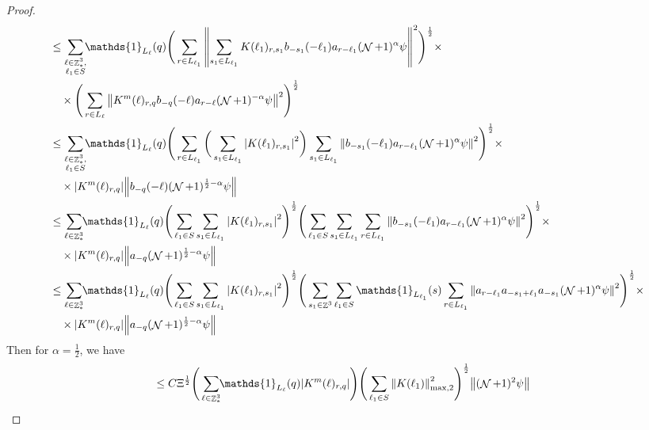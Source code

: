 \documentclass[12pt,a4paper]{article}
\numberwithin{equation}{section}
\newcommand{\1}{\mathbb{I}}
\DeclareMathOperator{\Z}{\mathbb{Z}}
\DeclareMathOperator{\NN}{\mathcal{N}}
\newcommand{\half}{\frac{1}{2}}
\newcommand{\normmaxii}[1]{\norm{#1}_{\mathrm{max,2}}}
\theoremstyle{plain}
\theoremstyle{definition}
\theoremstyle{remark}
\theoremstyle{plain}
\theoremstyle{definition}
\theoremstyle{remark}
\begin{document}
\begin{proof}
\begin{align}
		&\leq \sum\limits_{\substack{\ell \in \Z^3_*,\\\ell_1 \in S}} \!\!\mathds{1}_{L_\ell}(q) \Bigg( \sum\limits_{r \in L_{\ell_1}} \norm{\sum\limits_{s_1 \in L_{\ell_1}} K(\ell_1)_{r,s_1} b_{-s_1}(-\ell_1) a_{r-\ell_1} (\NN+1)^{\alpha}\psi}^2\Bigg)^\half \times\nonumber\\
		&\quad \times \Bigg( \sum\limits_{r \in L_\ell}  \norm{  K^{m}(\ell)_{r,q}  b_{-q}(-\ell) a_{r-\ell} (\NN+1)^{-\alpha}\psi }^2\Bigg)^\half \nonumber\\
		&\leq \sum\limits_{\substack{\ell \in \Z^3_*,\\ \ell_1 \in S}} \!\!\mathds{1}_{L_\ell}(q) \Bigg( \sum\limits_{r \in L_{\ell_1}} \bigg( \sum\limits_{s_1 \in L_{\ell_1}}\abs{K(\ell_1)_{r,s_1}}^2\bigg) \sum\limits_{s_1 \in L_{\ell_1}} \norm{ b_{-s_1}(-\ell_1)  a_{r-\ell_1} (\NN+1)^{\alpha}\psi}^2\Bigg)^\half \times\nonumber\\
		&\quad \times  \abs{  K^{m}(\ell)_{r,q}} \norm{b_{-q}(-\ell) (\NN+1)^{\half-\alpha}\psi } \nonumber\\
		&\leq \sum\limits_{\ell \in \Z^3_*} \!\!\mathds{1}_{L_\ell}(q) \Bigg( \sum\limits_{ \ell_1 \in S}  \sum\limits_{s_1 \in L_{\ell_1}}\abs{K(\ell_1)_{r,s_1}}^2\Bigg)^\half \Bigg(\sum\limits_{ \ell_1 \in S}  \sum\limits_{s_1 \in L_{\ell_1}} \sum\limits_{r \in L_{\ell_1}}\norm{ b_{-s_1}(-\ell_1)  a_{r-\ell_1} (\NN+1)^{\alpha}\psi}^2\Bigg)^\half \times\nonumber\\
		&\quad \times  \abs{  K^{m}(\ell)_{r,q}} \norm{a_{-q} (\NN+1)^{\half-\alpha}\psi } \nonumber\\
		&\leq \sum\limits_{\ell \in \Z^3_*} \!\!\mathds{1}_{L_\ell}(q) \Bigg( \sum\limits_{ \ell_1 \in S}  \sum\limits_{s_1 \in L_{\ell_1}}  \abs{K(\ell_1)_{r,s_1}}^2\Bigg)^\half \Bigg(  \sum\limits_{s_1 \in \Z^3} \sum\limits_{ \ell_1 \in S} \mathds{1}_{L_{\ell_1}}(s) \sum\limits_{r \in L_{\ell_1}} \norm{ a_{r-\ell_1} a_{-s_1+\ell_1}a_{-s_1}   (\NN+1)^{\alpha}\psi}^2\Bigg)^\half \times\nonumber\\
		&\quad \times  \abs{  K^{m}(\ell)_{r,q}} \norm{a_{-q} (\NN+1)^{\half-\alpha}\psi } \nonumber\\
	\end{align}
	Then for $\alpha = \half$, we have 
	\begin{align}
		&\leq C \Xi^{\half} \Bigg(\sum\limits_{\ell \in \Z^3_*} \!\!\mathds{1}_{L_\ell}(q) \abs{  K^{m}(\ell)_{r,q}}\Bigg)  \Bigg( \sum\limits_{ \ell_1 \in S}    \normmaxii{K(\ell_1)}^2\Bigg)^\half  \norm{    (\NN+1)^{2}\psi} 
	\end{align}

\end{proof}
\end{document}
